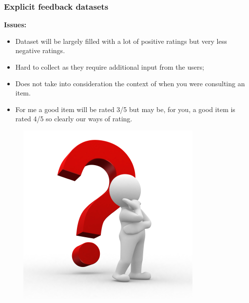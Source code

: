 \begin{frame}
\hspace{-0.5cm}
\frametitle{Explicit feedback datasets}
\hspace{-0.5cm}
{\Large
\vspace{5mm}
\textbf{Issues:}
\par}
\hspace{-0.7cm}
\begin{minipage}{0.75\linewidth}
\begin{itemize}
    \item Dataset will be largely filled with a lot of positive ratings but very less negative ratings.
    \item Hard to collect as they require additional input from the users;
    \item Does not take into consideration the context of when you were consulting an item.
    \item For me a good item will be rated 3/5 but may be, for you, a good item is rated 4/5 so clearly our ways of rating.
\end{itemize}
\end{minipage}
	 \begin{minipage}{0.2\linewidth}
	 
	    \begin{figure}
            \includegraphics[scale=0.3]{figures/issues.jpg}
		\end{figure}
	 \end{minipage}
\end{frame}


